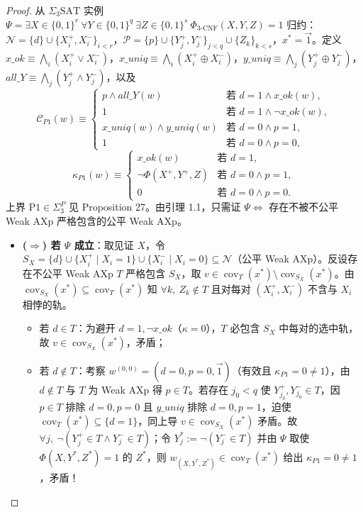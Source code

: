 \documentclass[11pt,a4paper]{article}
\newcommand{\C}{\mathcal{C}}
\newcommand{\N}{\mathcal{N}}
\newcommand{\Prot}{\mathcal{P}}
\newcommand{\cov}{\operatorname{cov}}
\begin{document}
\begin{proof}
从 $\Sigma_3\text{SAT}$ 实例 $\Psi = \exists X \in \{0,1\}^r\ \forall Y \in \{0,1\}^q\ \exists Z \in \{0,1\}^s\ \Phi_{\text{3-CNF}}(X,Y,Z)=1$ 归约：
$\N = \{d\} \cup \{X_i^+, X_i^-\}_{i<r}$，$\Prot = \{p\} \cup \{Y_j^+, Y_j^-\}_{j<q} \cup \{Z_k\}_{k<s}$，$x^* = \vec{1}$。定义 $x\_ok \equiv \bigwedge_i (X_i^+ \lor X_i^-)$，$x\_uniq \equiv \bigwedge_i (X_i^+ \oplus X_i^-)$，$y\_uniq \equiv \bigwedge_j (Y_j^+ \oplus Y_j^-)$，$all\_Y \equiv \bigwedge_j (Y_j^+ \land Y_j^-)$，以及
\[
  \C_{P1}(w) \equiv \begin{cases}
    p \land all\_Y(w) & \text{若 } d=1 \land x\_ok(w),\\
    1 & \text{若 } d=1 \land \neg x\_ok(w),\\
    x\_uniq(w) \land y\_uniq(w) & \text{若 } d=0 \land p=1,\\
    1 & \text{若 } d=0 \land p=0,
  \end{cases}
\]
\[
  \kappa_{P1}(w) \equiv \begin{cases}
    x\_ok(w) & \text{若 } d=1,\\
    \neg\Phi(X^+,Y^+,Z) & \text{若 } d=0 \land p=1,\\
    0 & \text{若 } d=0 \land p=0.
  \end{cases}
\]
上界 $\mathrm{P1} \in \Sigma_3^P$ 见 Proposition 27。由引理 1.1，只需证 $\Psi \iff$ 存在不被不公平 Weak AXp 严格包含的公平 Weak AXp。
\begin{itemize}
  \item \textbf{($\Rightarrow$) 若 $\Psi$ 成立}：取见证 $X$，令 $S_X = \{d\} \cup \{X_i^+ \mid X_i=1\} \cup \{X_i^- \mid X_i=0\} \subseteq \N$（公平 Weak AXp）。反设存在不公平 Weak AXp $T$ 严格包含 $S_X$，取 $v \in \cov_T(x^*) \setminus \cov_{S_X}(x^*)$。由 $\cov_{S_X}(x^*) \subseteq \cov_T(x^*)$ 知 $\forall k,\ Z_k \notin T$ 且对每对 $(X_i^+, X_i^-)$ 不含与 $X_i$ 相悖的轨。
  \begin{itemize}
    \item 若 $d \in T$：为避开 $d=1, \neg x\_ok$（$\kappa=0$），$T$ 必包含 $S_X$ 中每对的选中轨，故 $v \in \cov_{S_X}(x^*)$，矛盾；
    \item 若 $d \notin T$：考察 $w^{(0,0)} = (d=0, p=0, \vec{1})$（有效且 $\kappa_{P1}=0 \ne 1$），由 $d \notin T$ 与 $T$ 为 Weak AXp 得 \textbf{$p \in T$}。若存在 $j_0 < q$ 使 $Y_{j_0}^+, Y_{j_0}^- \in T$，因 $p \in T$ 排除 $d=0,p=0$ 且 $y\_uniq$ 排除 $d=0,p=1$，迫使 $\cov_T(x^*) \subseteq \{d=1\}$，同上导 $v \in \cov_{S_X}(x^*)$ 矛盾。故 $\forall j,\ \neg(Y_j^+ \in T \land Y_j^- \in T)$；令 $Y^*_j := \neg(Y_j^- \in T)$ 并由 $\Psi$ 取使 $\Phi(X,Y^*,Z^*)=1$ 的 $Z^*$，则 $w_{(X,Y^*,Z^*)} \in \cov_T(x^*)$ 给出 $\kappa_{P1}=0 \ne 1$，矛盾！

\end{itemize}
\end{itemize}
\end{proof}
\end{document}
